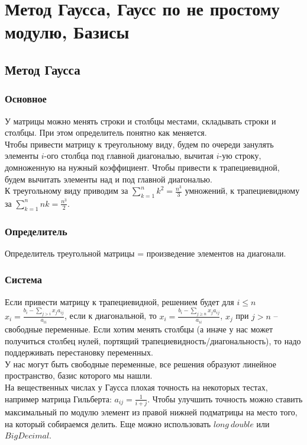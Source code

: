 \chapter{Метод Гаусса, Гаусс по не простому модулю, Базисы}

\section{Метод Гаусса}

\subsection{Основное}
У матрицы можно менять строки и столбцы местами, складывать строки и столбцы. При этом определитель понятно как меняется.\\
Чтобы привести матрицу к треугольному виду, будем по очереди занулять элементы $i$-ого столбца под главной диагональю, вычитая $i$-ую строку, домноженную на нужный коэффициент. Чтобы привести к трапециевидной, будем вычитать элементы над и под главной диагональю.\\
К треугольному виду приводим за $\sum_{k=1}^{n}{k^2} = \frac{n^3}{3}$ умножений, к трапециевидному за $\sum_{k=1}^{n}{nk} = \frac{n^3}{2}$.
\subsection{Определитель}
Определитель треугольной матрицы = произведение элементов на диагонали.
\subsection{Система}
Если привести матрицу к трапециевидной, решением будет для $i\le n$ $x_i=\frac{b_i-\sum_{j>i}{x_ja_{ij}}}{a_{ii}}$, если к диагональной, то $x_i=\frac{b_i-\sum_{j\ge n}{x_ja_{ij}}}{a_{ii}}$, $x_j$ при $j>n$ -- свободные переменные. Если хотим менять столбцы (а иначе у нас может получиться столбец нулей, портящий трапециевидность/диагональность), то надо поддерживать перестановку переменных.\\
У нас могут быть свободные переменные, все решения образуют линейное пространство, базис которого мы нашли.\\
На вещественных числах у Гаусса плохая точность на некоторых тестах, например матрица Гильберта: $a_{ij}=\frac{1}{i+j}$. Чтобы улучшить точность можно ставить максимальный по модулю элемент из правой нижней подматрицы на место того, на который собираемся делить. Еще можно использовать $long\ double$ или $BigDecimal$.
